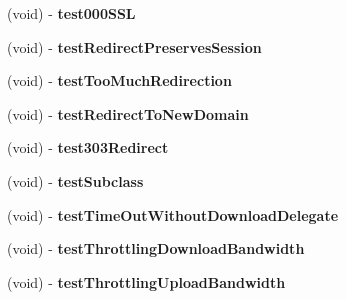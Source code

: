 \begin{DoxyCompactItemize}
\item 
\hypertarget{interface_a_s_i_h_t_t_p_request_tests_a91af84b41f3a46f64d16095adb340214}{
(void) -\/ {\bfseries test000\-S\-S\-L}}
\label{interface_a_s_i_h_t_t_p_request_tests_a91af84b41f3a46f64d16095adb340214}

\item 
\hypertarget{interface_a_s_i_h_t_t_p_request_tests_a3132c64a767dc4789eedb611544874b7}{
(void) -\/ {\bfseries test\-Redirect\-Preserves\-Session}}
\label{interface_a_s_i_h_t_t_p_request_tests_a3132c64a767dc4789eedb611544874b7}

\item 
\hypertarget{interface_a_s_i_h_t_t_p_request_tests_abdde777c6d2c53c38bbbd414f01ab11c}{
(void) -\/ {\bfseries test\-Too\-Much\-Redirection}}
\label{interface_a_s_i_h_t_t_p_request_tests_abdde777c6d2c53c38bbbd414f01ab11c}

\item 
\hypertarget{interface_a_s_i_h_t_t_p_request_tests_a0e46e6d0e9b2075145255c89cb0f23ae}{
(void) -\/ {\bfseries test\-Redirect\-To\-New\-Domain}}
\label{interface_a_s_i_h_t_t_p_request_tests_a0e46e6d0e9b2075145255c89cb0f23ae}

\item 
\hypertarget{interface_a_s_i_h_t_t_p_request_tests_a486f80b7859c2c3ea72e06a28fdcf789}{
(void) -\/ {\bfseries test303\-Redirect}}
\label{interface_a_s_i_h_t_t_p_request_tests_a486f80b7859c2c3ea72e06a28fdcf789}

\item 
\hypertarget{interface_a_s_i_h_t_t_p_request_tests_aeb6e4b4f2fc9f3a74b3cd2a6c42341d5}{
(void) -\/ {\bfseries test\-Subclass}}
\label{interface_a_s_i_h_t_t_p_request_tests_aeb6e4b4f2fc9f3a74b3cd2a6c42341d5}

\item 
\hypertarget{interface_a_s_i_h_t_t_p_request_tests_ae19beb94bca46a1dcb81e4729dc89f2f}{
(void) -\/ {\bfseries test\-Time\-Out\-Without\-Download\-Delegate}}
\label{interface_a_s_i_h_t_t_p_request_tests_ae19beb94bca46a1dcb81e4729dc89f2f}

\item 
\hypertarget{interface_a_s_i_h_t_t_p_request_tests_af14e80be1ca16f71c636a799356bb92d}{
(void) -\/ {\bfseries test\-Throttling\-Download\-Bandwidth}}
\label{interface_a_s_i_h_t_t_p_request_tests_af14e80be1ca16f71c636a799356bb92d}

\item 
\hypertarget{interface_a_s_i_h_t_t_p_request_tests_a65f252fc1eea28887974dd1ff8354609}{
(void) -\/ {\bfseries test\-Throttling\-Upload\-Bandwidth}}
\label{interface_a_s_i_h_t_t_p_request_tests_a65f252fc1eea28887974dd1ff8354609}


\end{DoxyCompactItemize}
